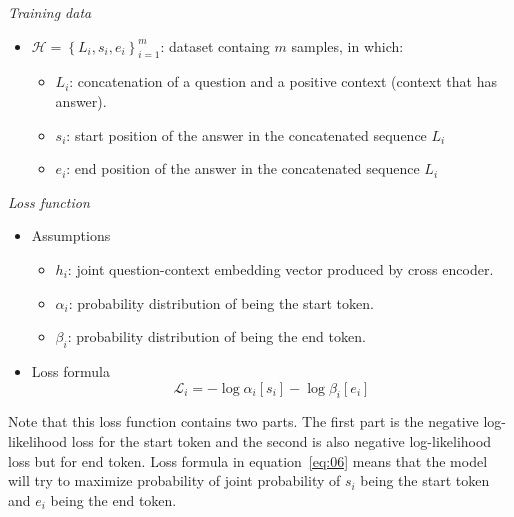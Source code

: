 \documentclass[12pt, sort&compress]{report}
\begin{document}
\par \textit{Training data}
\begin{itemize}
	\item $\mathcal{H} = \left\{ L_i, s_i, e_i\right\}_{i=1}^{m}$: dataset containg $m$ samples, in which:
	\begin{itemize}
		\item $L_i$: concatenation of a question and a positive context (context that has answer).
		\item $s_i$: start position of the answer in the concatenated sequence $L_i$
		\item $e_i$: end position of the answer in the concatenated sequence $L_i$
	\end{itemize}
\end{itemize}
\par \textit{Loss function}
\begin{itemize}
	\item Assumptions
	\begin{itemize}
		\item $h_i$: joint question-context embedding vector produced by cross encoder.
		\item $\alpha_i$: probability distribution of being the start token.
		\item $\beta_i$: probability distribution of being the end token.
	\end{itemize}
	\item Loss formula 
	\begin{equation}\label{eq:06}\mathcal{L}_i = -\log\alpha_i[s_i] - \log\beta_i[e_i]\end{equation}
\end{itemize}
Note that this loss function contains two parts. The first part is the negative log-likelihood loss for the start token and the second is also negative log-likelihood loss but for end token. Loss formula in equation~\eqref{eq:06} means that the model will try to maximize probability of joint probability of $s_i$ being the start token and $e_i$ being the end token.
\end{document}

